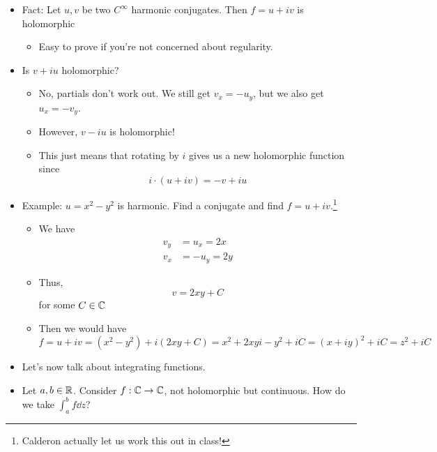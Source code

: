 \documentclass[../notes.tex]{subfiles}
\begin{document}
\begin{itemize}
    \item Fact: Let $u,v$ be two $C^\infty$ harmonic conjugates. Then $f=u+iv$ is holomorphic
    \begin{itemize}
        \item Easy to prove if you're not concerned about regularity.
    \end{itemize}
    \item Is $v+iu$ holomorphic?
    \begin{itemize}
        \item No, partials don't work out. We still get $v_x=-u_y$, but we also get $u_x=-v_y$.
        \item However, $v-iu$ is holomorphic!
        \item This just means that rotating by $i$ gives us a new holomorphic function since
        \begin{equation*}
            i\cdot(u+iv) = -v+iu
        \end{equation*}
    \end{itemize}
    \item Example: $u=x^2-y^2$ is harmonic. Find a conjugate and find $f=u+iv$.\footnote{Calderon actually let us work this out in class!}
    \begin{itemize}
        \item We have
        \begin{align*}
            v_y &= u_x = 2x\\
            v_x &= -u_y = 2y
        \end{align*}
        \item Thus,
        \begin{equation*}
            v = 2xy+C
        \end{equation*}
        for some $C\in\mathbb{C}$
        \item Then we would have
        \begin{equation*}
            f = u+iv
            = (x^2-y^2)+i(2xy+C)
            = x^2+2xyi-y^2+iC
            = (x+iy)^2+iC
            = z^2+iC
        \end{equation*}
    \end{itemize}
    \item Let's now talk about integrating functions.
    \item Let $a,b\in\mathbb{R}$. Consider $f:\mathbb{C}\to\mathbb{C}$, not holomorphic but continuous. How do we take $\int_a^bf\dd{z}$?
    \begin{figure}[H]
        \centering
\end{figure}
\end{itemize}
\end{document}
